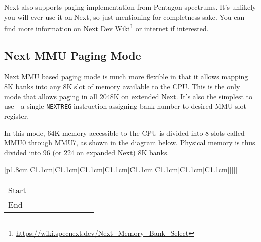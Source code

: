 Next also supports paging implementation from Pentagon spectrums. It's unlikely you will ever use it on Next, so just mentioning for completness sake. You can find more information on Next Dev Wiki\footnote{\url{https://wiki.specnext.dev/Next_Memory_Bank_Select}} or internet if interested.


\pagebreak
\subsection{Next MMU Paging Mode}

Next MMU based paging mode is much more flexible in that it allows mapping 8K banks into any 8K slot of memory available to the CPU. This is the only mode that allows paging in all 2048K on extended Next. It's also the simplest to use - a single {\tt NEXTREG} instruction assigning bank number to desired MMU slot register.

In this mode, 64K memory accessible to the CPU is divided into 8 slots called MMU0 through MMU7, as shown in the diagram below. Physical memory is thus divided into 96 (or 224 on expanded Next) 8K banks.

\begin{ElegantTable}{|p{1.8cm}|C{1.1cm}|C{1.1cm}|C{1.1cm}|C{1.1cm}|C{1.1cm}|C{1.1cm}|C{1.1cm}|C{1.1cm}|}[][]
\end{ElegantTable}

\vspace*{-0.75em}

\begin{tabular}{|p{1.8cm}|C{1.1cm}|C{1.1cm}|C{1.1cm}|C{1.1cm}|C{1.1cm}|C{1.1cm}|C{1.1cm}|C{1.1cm}|}
	\hline
	Start	& 	& 	& 	& 	& 	& 	& 	&  \\
	End		& 	& 	& 	& 	& 	& 	& 	&  \\
	\hline
\end{tabular}

\vspace*{-0.7em}

